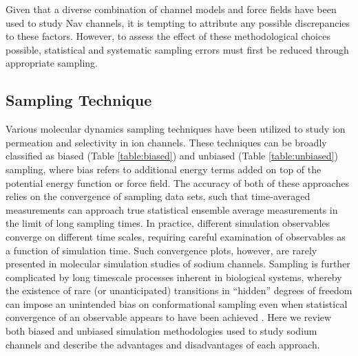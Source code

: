 \begin{refsection}
Given that a diverse combination of channel models and force fields have been used to study Nav channels, it is tempting to attribute any possible discrepancies to these factors.  However, to assess the effect of these methodological choices possible, statistical and systematic sampling errors must first be reduced through appropriate sampling.
 
 \subsection{Sampling Technique}
 Various molecular dynamics sampling techniques have been utilized to study ion permeation and selectivity in ion channels.  These techniques can be broadly classified as biased (Table \ref{table:biased}) and unbiased (Table \ref{table:unbiased}) sampling, where bias refers to additional energy terms added on top of the potential energy function or force field.  The accuracy of both of these approaches relies on the convergence of sampling data sets, such that time-averaged measurements can approach true statistical ensemble average measurements in the limit of long sampling times.  In practice, different simulation observables converge on different time scales, requiring careful examination of observables as a function of simulation time.  Such convergence plots, however, are rarely presented in molecular simulation studies of sodium channels.  Sampling is further complicated by long timescale processes inherent in biological systems, whereby the existence of rare (or unanticipated) transitions in ``hidden'' degrees of freedom can impose an unintended bias on conformational sampling even when statistical convergence of an observable appears to have been achieved \cite{Neale:2011jt}.  Here we review both biased and unbiased simulation methodologies used to study sodium channels and describe the advantages and disadvantages of each approach.
 

\end{refsection}
